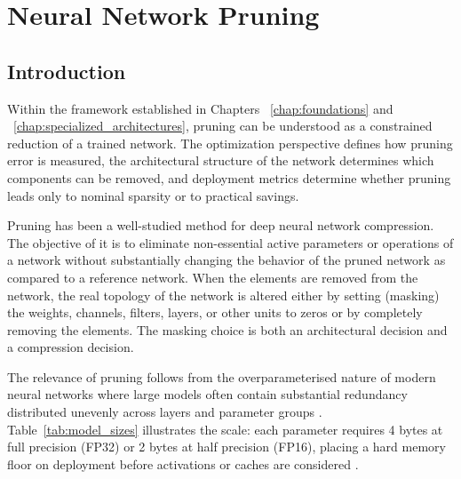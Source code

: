 ﻿\chapter{Neural Network Pruning}
\label{chap:neural_network_pruning}

\section{Introduction}
\label{sec:pruning_intro}

Within the framework established in Chapters ~\ref{chap:foundations} and ~\ref{chap:specialized_architectures}, pruning can be understood as a
constrained reduction of a trained network. The optimization perspective defines how
pruning error is measured, the architectural structure of the network determines which
components can be removed, and deployment metrics determine
whether pruning leads only to nominal sparsity or to practical savings.

Pruning has been a well-studied method for deep neural network compression. The objective of it is to eliminate non-essential active parameters or operations of a network without substantially changing the behavior of the pruned network as compared to a reference network. When the elements are removed from the network, the real topology of the network is altered either by setting (masking) the weights, channels, filters, layers, or other units to zeros or by completely removing the elements. The masking choice is both an architectural decision and a compression decision.

The relevance of pruning follows from the overparameterised nature of modern
neural networks where large models often contain substantial redundancy distributed
unevenly across layers and parameter groups \cite{denil2013predicting,michel2022not}. Table~\ref{tab:model_sizes}
illustrates the scale: each parameter requires 4 bytes at full precision (FP32)
or 2 bytes at half precision (FP16), placing a hard memory floor on deployment
before activations or caches are considered
\cite{He2016,devlin2019bert,radford2019language,touvron2023llama2,achiam2023gpt}.

